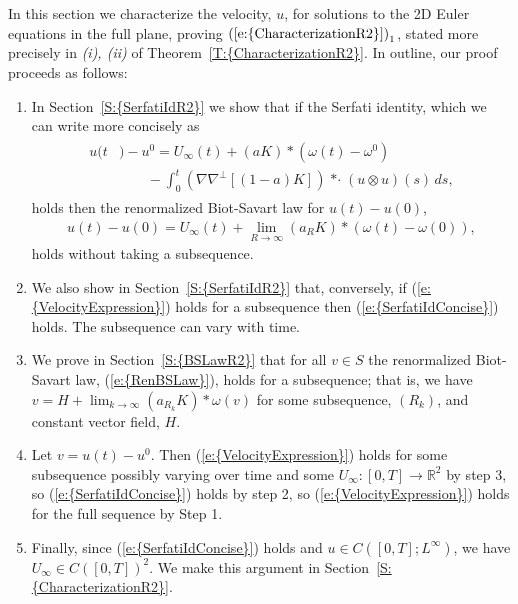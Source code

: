 \documentclass[reqno,openright,11pt,twoside]{amsart}
\theoremstyle{definition}
\numberwithin{equation}{section}
\begin{document}
\noindent In this section we characterize the velocity, $u$, for solutions to the 2D Euler equations in the full plane, proving ${(\ref{e:{CharacterizationR2}})}_1$, stated more precisely in \textit{(i), (ii)} of {Theorem~\ref{T:{CharacterizationR2}}}. In outline, our proof proceeds as follows:

\begin{enumerate}

\item
In {Section~\ref{S:{SerfatiIdR2}}} we show that if the Serfati identity, which we can write more concisely as
\begin{align}\label{e:SerfatiIdConcise}
    \begin{split}
        u(t&) - u^0
            = U_{\ensuremath{\infty}}(t) + (a K) *(\omega(t) - \omega^0) \\
        &\qquad- \int_0^t {\ensuremath{\left( {{\ensuremath{\nabla}} {\ensuremath{\nabla}}^\perp {\ensuremath{\left[ {(1 - a) K} \right]}}} \right) }}
        {\mathop{* \cdot}} (u \otimes u)(s) \, ds,
    \end{split}
\end{align}
holds then the renormalized Biot-Savart law for $u(t) - u(0)$,
\begin{align}\label{e:VelocityExpression}
		\displaystyle u(t) - u(0) = U_{\ensuremath{\infty}}(t)
		   + \lim_{R \to {\ensuremath{\infty}}} (a_R K) * (\omega(t) - \omega(0)),
\end{align}
holds without taking a subsequence.

\item
We also show in {Section~\ref{S:{SerfatiIdR2}}} that, conversely, if {(\ref{e:{VelocityExpression}})} holds for a subsequence then {(\ref{e:{SerfatiIdConcise}})} holds. The subsequence can vary with time. 

	
\item
We prove in {Section~\ref{S:{BSLawR2}}} that for all $v \in S$ the renormalized Biot-Savart law, {(\ref{e:{RenBSLaw}})}, holds for a subsequence; that is, we have $v = H + \lim_{k \to {\ensuremath{\infty}}} (a_{R_k} K) * \omega(v)$ for some subsequence, $(R_k)$, and constant vector field, $H$.
		
\item Let $v = u(t) - u^0$. Then {(\ref{e:{VelocityExpression}})} holds for some subsequence possibly varying over time and some $U_{\ensuremath{\infty}} \colon [0, T] \to {\ensuremath{{\ensuremath{\mathbb{{R}}}}}}^2$ by step 3, so {(\ref{e:{SerfatiIdConcise}})} holds by step 2, so {(\ref{e:{VelocityExpression}})} holds for the full sequence by Step 1.

\item
Finally, since {(\ref{e:{SerfatiIdConcise}})} holds and $u \in C([0, T]; L^{\ensuremath{\infty}})$, we have $U_{\ensuremath{\infty}} \in C([0, T])^2$. We make this argument in {Section~\ref{S:{CharacterizationR2}}}.
 
\end{enumerate}
\end{document}
